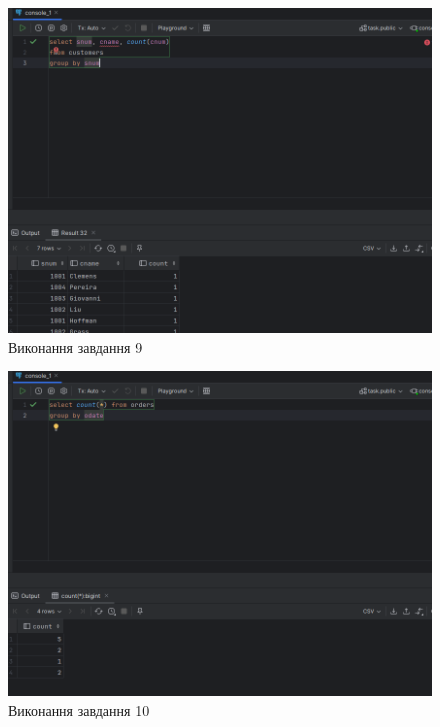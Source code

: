 \documentclass[14pt]{extreport}
\begin{document}
\begin{normalsize}
	\begin{figure}[H]
		\centering
		\includegraphics[scale=0.45]{9}
		\caption{Виконання завдання 9}
	\end{figure}
	
	\begin{figure}[H]
		\centering
		\includegraphics[scale=0.45]{10}
		\caption{Виконання завдання 10}
	\end{figure}
	

\end{normalsize}
\end{document}
